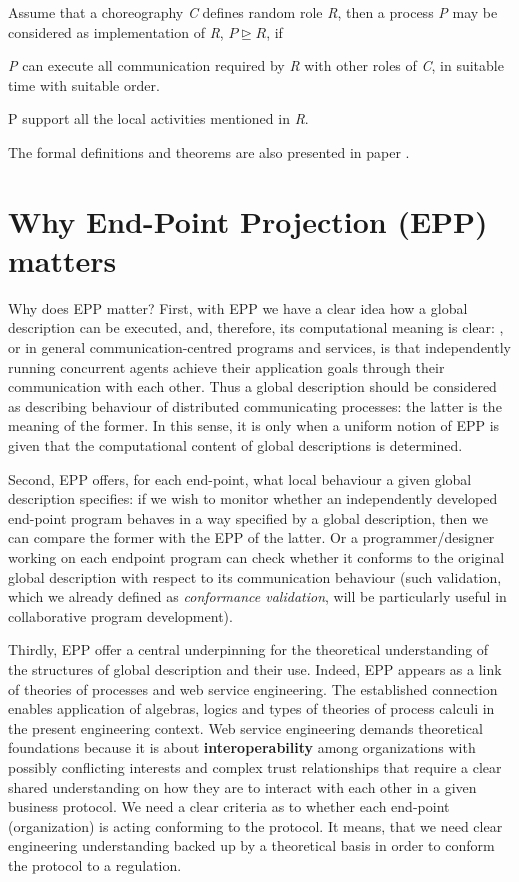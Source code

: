 Assume that a choreography \textit{C} defines random role \textit{R}, then a process \textit{P} may be considered as implementation of \textit{R}, $P \unrhd R$, if 

\begin{compactenum}
\item  \textit{P} can execute all communication required by \textit{R} with other roles of \textit{C}, in suitable time with suitable order.

\item  P support all the local activities mentioned in \textit{R}.
\end{compactenum}

\noindent The formal definitions and theorems are also presented in paper \cite{essence-choreography}.

\section{Why End-Point Projection (EPP) matters}

Why does EPP matter? First, with EPP we have a clear idea how a global description can be executed, and, therefore, its computational meaning is clear:  , or in general communication-centred programs and services, is that independently running concurrent agents achieve their application goals through their communication with each other. Thus a global description should be considered as describing behaviour of distributed communicating processes: the latter is the meaning of the former. In this sense, it is only when a uniform notion of EPP is given that the computational content of global descriptions is determined.

Second, EPP offers, for each end-point, what local behaviour a given global description specifies: if we wish to monitor whether an independently developed end-point program behaves in a way specified by a global description, then we can compare the former with the EPP of the latter. Or a programmer/designer working on each endpoint program can check whether it conforms to the original global description with respect to its communication behaviour (such validation, which we already defined as \textit{conformance validation}, will be particularly useful in collaborative program development).

Thirdly, EPP offer a central underpinning for the theoretical understanding of the structures of global description and their use. Indeed, EPP appears as a link of theories of processes and web service engineering. The established connection enables application of algebras, logics and types of theories of process calculi in the present engineering context. Web service engineering demands theoretical foundations because it is about \textbf{interoperability} among organizations with possibly conflicting interests and complex trust relationships that require a clear shared understanding on how they are to interact with each other in a given business protocol. We need a clear criteria as to whether each end-point (organization) is acting conforming to the protocol. It means, that we need clear engineering understanding backed up by a theoretical basis in order to conform the protocol to a regulation. 

